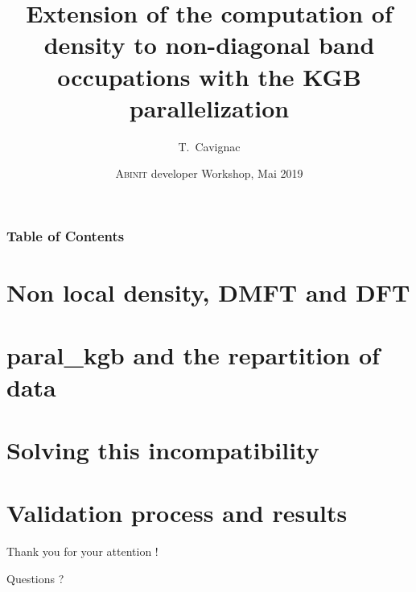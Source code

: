\documentclass[22pt]{beamer}
\title{Extension of the computation of density to non-diagonal band occupations with the KGB parallelization}
\author{T.~Cavignac}
\institute{
  CEA DAM Ile-de-France
  \and
  École Centrale de Lyon
}
\date{\textsc{Abinit} developer Workshop, Mai 2019}
\newcommand{\nologo}{\logo{}}
\begin{document}
  \frame{\titlepage}

  \nologo

  \begin{frame}
    \frametitle{Table of Contents}
    \tableofcontents
  \end{frame}

  \section{Non local density, DMFT and DFT}
  

  \section{paral\_kgb and the repartition of data}
  

  \section{Solving this incompatibility}
  

  \section{Validation process and results}
  

  {\nologo
    \begin{frame}[focus]
      Thank you for your attention !
    \end{frame}

    \begin{frame}[focus]
      Questions ?
    \end{frame}
  }
\end{document}
